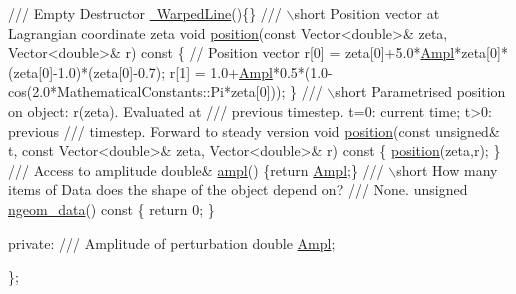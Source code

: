 \begin{DoxyCodeInclude}
\textcolor{comment}{}
\textcolor{comment}{ /// Empty Destructor}
\textcolor{comment}{} \hyperlink{classWarpedLine_a4cb07fb7f06d42e2008afe65d8750cad}{~WarpedLine}()\{\}
\textcolor{comment}{}
\textcolor{comment}{ /// \(\backslash\)short Position vector at Lagrangian coordinate zeta }
\textcolor{comment}{} \textcolor{keywordtype}{void} \hyperlink{classWarpedLine_aaeef89818148ee3a305c561e91c8851d}{position}(\textcolor{keyword}{const} Vector<double>& zeta, Vector<double>& r)\textcolor{keyword}{ const}
\textcolor{keyword}{  }\{
   \textcolor{comment}{// Position vector}
   r[0] = zeta[0]+5.0*\hyperlink{classWarpedLine_ac44286e84ff213e67e0f247d00ad50af}{Ampl}*zeta[0]*(zeta[0]-1.0)*(zeta[0]-0.7);
   r[1] = 1.0+\hyperlink{classWarpedLine_ac44286e84ff213e67e0f247d00ad50af}{Ampl}*0.5*(1.0-cos(2.0*MathematicalConstants::Pi*zeta[0]));
  \}
 \textcolor{comment}{}
\textcolor{comment}{ /// \(\backslash\)short Parametrised position on object: r(zeta). Evaluated at}
\textcolor{comment}{ /// previous timestep. t=0: current time; t>0: previous}
\textcolor{comment}{ /// timestep. Forward to steady version}
\textcolor{comment}{} \textcolor{keywordtype}{void} \hyperlink{classWarpedLine_aaeef89818148ee3a305c561e91c8851d}{position}(\textcolor{keyword}{const} \textcolor{keywordtype}{unsigned}& t, \textcolor{keyword}{const} Vector<double>& zeta,
                       Vector<double>& r)\textcolor{keyword}{ const}
\textcolor{keyword}{  }\{
   \hyperlink{classWarpedLine_aaeef89818148ee3a305c561e91c8851d}{position}(zeta,r);
  \}
\textcolor{comment}{}
\textcolor{comment}{ /// Access to amplitude}
\textcolor{comment}{} \textcolor{keywordtype}{double}& \hyperlink{classWarpedLine_ae43c2f997b9c0de62783375341ac5794}{ampl}() \{\textcolor{keywordflow}{return} \hyperlink{classWarpedLine_ac44286e84ff213e67e0f247d00ad50af}{Ampl};\}
\textcolor{comment}{}
\textcolor{comment}{ /// \(\backslash\)short How many items of Data does the shape of the object depend on?}
\textcolor{comment}{ /// None.}
\textcolor{comment}{} \textcolor{keywordtype}{unsigned} \hyperlink{classWarpedLine_aa4157cd4ff2e80f33b106b7ed4e4d804}{ngeom\_data}()\textcolor{keyword}{ const}
\textcolor{keyword}{  }\{
   \textcolor{keywordflow}{return} 0;
  \}
 
\textcolor{keyword}{private}:
\textcolor{comment}{}
\textcolor{comment}{ /// Amplitude of perturbation}
\textcolor{comment}{} \textcolor{keywordtype}{double} \hyperlink{classWarpedLine_ac44286e84ff213e67e0f247d00ad50af}{Ampl};

\};

\end{DoxyCodeInclude}




